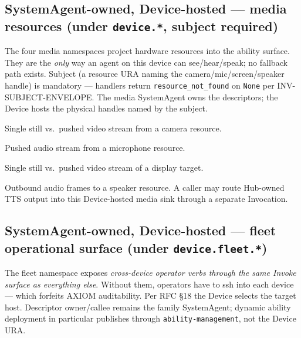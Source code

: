 \documentclass[10pt,a4paper]{article}
\newcommand{\code}[1]{\texttt{\small #1}}
\begin{document}
\subsection{SystemAgent-owned, Device-hosted --- media resources (under \texttt{\small device.*}, subject required)}

The four media namespaces project hardware resources into the
ability surface. They are the \emph{only} way an agent on this device
can see/hear/speak; no fallback path exists. Subject (a resource URA
naming the camera/mic/screen/speaker handle) is mandatory --- handlers
return \code{resource\_not\_found} on \code{None} per
\textsc{INV-SUBJECT-ENVELOPE}.
The media SystemAgent owns the descriptors; the Device hosts the physical
handles named by the subject.

\begin{description}[leftmargin=1.4em,style=nextline,itemsep=0.15em]
  \item[\codew{camera.snapshot}, \codew{camera.subscribe}] Single
  still vs.\ pushed video stream from a camera resource.
  \item[\codew{mic.subscribe}] Pushed audio stream from a microphone
  resource.
  \item[\codew{screen.snapshot}, \codew{screen.subscribe}] Single
  still vs.\ pushed video stream of a display target.
  \item[\codew{speaker.publish}] Outbound audio frames to a speaker
  resource. A caller may route Hub-owned  TTS
  output into this Device-hosted media sink through a separate Invocation.
\end{description}

\subsection{SystemAgent-owned, Device-hosted --- fleet operational surface (under \texttt{\small device.fleet.*})}

The fleet namespace exposes \emph{cross-device operator verbs through
the same Invoke surface as everything else}. Without them, operators
have to ssh into each device --- which forfeits AXIOM auditability.
Per RFC §18 the Device selects the target host. Descriptor owner/callee remains
the family SystemAgent; dynamic ability deployment in particular publishes
through \code{ability-management}, not the Device URA.
\end{document}
